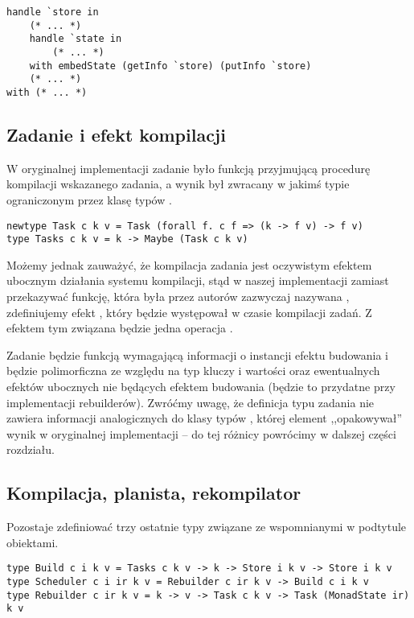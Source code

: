 \begin{lstlisting}[language=Haleff, float=h, title={Przykład wykorzystania \helinl{embedState}}]
handle `store in
    (* ... *)
    handle `state in
        (* ... *)
    with embedState (getInfo `store) (putInfo `store)
    (* ... *)
with (* ... *)
\end{lstlisting}

\subsection{Zadanie i efekt kompilacji}

W oryginalnej implementacji zadanie było funkcją przyjmującą procedurę kompilacji wskazanego zadania, a wynik był zwracany w jakimś typie  ograniczonym przez klasę typów .

\begin{lstlisting}[style=haskell-style]
newtype Task c k v = Task (forall f. c f => (k -> f v) -> f v)
type Tasks c k v = k -> Maybe (Task c k v)
\end{lstlisting}

Możemy jednak zauważyć, że kompilacja zadania jest oczywistym efektem ubocznym działania systemu kompilacji, stąd w naszej implementacji zamiast przekazywać funkcję, która była przez autorów zazwyczaj nazywana , zdefiniujemy efekt , który będzie występował w czasie kompilacji zadań. Z efektem tym związana będzie jedna operacja .



Zadanie będzie funkcją wymagającą informacji o instancji efektu budowania i będzie polimorficzna ze względu na typ kluczy i wartości oraz ewentualnych efektów ubocznych nie będących efektem budowania (będzie to przydatne przy implementacji rebuilderów). Zwróćmy uwagę, że definicja typu zadania nie zawiera informacji analogicznych do klasy typów , której element  ,,opakowywał'' wynik w oryginalnej implementacji -- do tej różnicy powrócimy w dalszej części rozdziału.

\subsection{Kompilacja, planista, rekompilator}

Pozostaje zdefiniować trzy ostatnie typy związane ze wspomnianymi w podtytule obiektami.

\begin{lstlisting}[style=haskell-style]
type Build c i k v = Tasks c k v -> k -> Store i k v -> Store i k v
type Scheduler c i ir k v = Rebuilder c ir k v -> Build c i k v
type Rebuilder c ir k v = k -> v -> Task c k v -> Task (MonadState ir) k v
\end{lstlisting}

